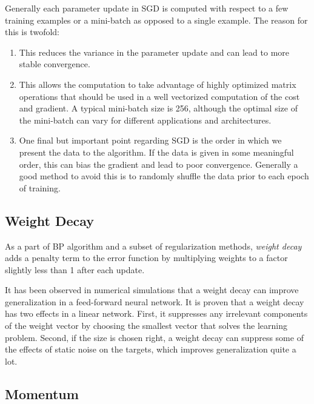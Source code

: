 Generally each parameter update in SGD is computed with respect to a few training examples or a mini-batch as opposed to a single example. The reason for this is twofold\cite{sgd}:
\begin{enumerate}
	\item This reduces the variance in the parameter update and can lead to more stable convergence. 
	\item This allows the computation to take advantage of highly optimized matrix operations that should be used in a well vectorized computation of the cost and gradient.  A typical mini-batch size is 256, although the optimal size of the mini-batch can vary for different applications and architectures.
	\item One final but important point regarding SGD is the order in which we present the data to the algorithm. If the data is given in some meaningful order, this can bias the gradient and lead to poor convergence. Generally a good method to avoid this is to randomly shuffle the data prior to each epoch of training.
\end{enumerate}

\subsection{Weight Decay}

As a part of BP algorithm and a subset of regularization methods, \textit{weight decay} adds a penalty term to the error function by multiplying weights to a factor slightly less than 1 after each update. 

 It has been observed in numerical simulations that a weight decay can improve generalization in a feed-forward neural network. It is proven that a weight decay has two effects in a linear network. First, it suppresses any irrelevant components of the weight vector by choosing the smallest vector that solves the learning problem. Second, if the size is chosen right, a weight decay can suppress some of the effects of static noise on the targets, which improves generalization quite a lot\cite{moody1995simple}. 

\subsection{Momentum}

